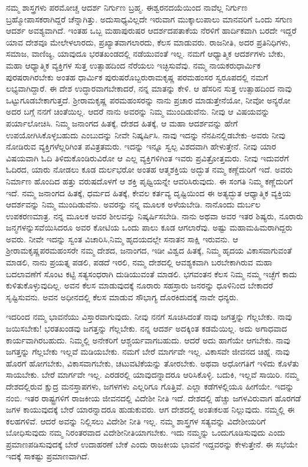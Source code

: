 ನಮ್ಮ ಶಾಸ್ತ್ರಗಳು ಪರಮೋಚ್ಚ ಆದರ್ಶ ನಿರ್ಗುಣ ಬ್ರಹ್ಮ. ಈಶ್ವರನ\break ದಯೆಯಿಂದ ನಾವೆಲ್ಲ ನಿರ್ಗುಣ ಬ್ರಹ್ಮೋಪಾಸಕರಾಗಿದ್ದರೆ ಚೆನ್ನಾಗಿತ್ತು. ಅದು\break ಸಾಧ್ಯವಿಲ್ಲದೇ ಇರುವಾಗ ಮುಕ್ಕಾಲುಪಾಲು ಮಾನವರಿಗೆ ಒಂದು ಸಗುಣ ಆದರ್ಶ ಅವಶ್ಯವಾಗಿದೆ. ಇಂತಹ ಒಬ್ಬ ಮಹಾಪುರುಷರ ಆದರ್ಶದ\break ಪತಾಕೆಯ ನೆರಳಿಗೆ ಹಾರ್ದಿಕವಾಗಿ ಬರದೇ ಇದ್ದರೆ ಯಾವ ದೇಶವೂ ಮೇಲೇಳ\-ಲಾರದು, ಪ್ರಖ್ಯಾತವಾಗಲಾರದು, ಕೆಲಸ ಮಾಡುವರು. ರಾಜನೀತಿ, ಅದರ ಪ್ರತಿನಿಧಿಗಳು, ಸಮಾಜ, ವಾಣಿಜ್ಯ, ಯಾವುದೂ ಭರತಖಂಡದಲ್ಲಿ ನಡೆಯುವಂತೆ ಇಲ್ಲ. ನಮಗೆ ಆಧ್ಯಾತ್ಮಿಕ ಆದರ್ಶಗಳು ಬೇಕು, ಮಹಾ ಆಧ್ಯಾತ್ಮಿಕ ವ್ಯಕ್ತಿಗಳ ಸುತ್ತ ಉತ್ಸಾಹದಿಂದ ನೆರೆಯಲು ಇಚ್ಛಿಸುವೆವು. ನಮ್ಮ ನಾಯಕರು\break ಧಾರ್ಮಿಕ ಪುರಷರಾಗಿರಬೇಕು ಅಂತಹ ಧಾರ್ಮಿಕ ಪುರುಷರೊಬ್ಬರು\break ರಾಮಕೃಷ್ಣ ಪರಮಹಂಸರ ಸ್ವರೂಪದಲ್ಲಿ ನಮಗೆ ಲಭ್ಯವಾಗಿದ್ದಾರೆ. ಈ ದೇಶ ಉದ್ಧಾರವಾಗಬೇಕಾದರೆ, ನನ್ನ ಮಾತನ್ನು ಕೇಳಿ. ಆ ಹೆಸರಿನ ಸುತ್ತ ಉತ್ಸಾಹದಿಂದ ನಾವು ಒಟ್ಟುಗೂಡಬೇಕಾಗುತ್ತದೆ. ಶ‍್ರೀರಾಮಕೃಷ್ಣ ಪರಮಹಂಸರನ್ನು ನಾನು ಪ್ರಚಾರ ಮಾಡುತ್ತೇನೆಯೋ, ನೀವೋ ಅನ್ಯರೋ ಅದರ ಬಗ್ಗೆ ನನಗೆ ಚಿಂತೆಯಿಲ್ಲ. ಆದರೆ ನಾನು ಅವರನ್ನು ನಿಮ್ಮ ಮುಂದಿಡುವೆನು. ನೀವು ಆ ವಿಷಯವನ್ನು ಪರ್ಯಾಲೋಚಿಸಿ. ನಿಮ್ಮ ಜನಾಂಗದ ಹಿತಕ್ಕೆ, ದೇಶದ ಹಿತಕ್ಕೆ, ಆ ಮಹಾ ಆದರ್ಶವನ್ನು ಹೇಗೆ ಉಪಯೋಗಿಸಿಕೊಳ್ಳಬಹುದು ಎಂಬುದನ್ನು ನೀವೇ ನಿಷ್ಕರ್ಷಿಸಿ. ನಾವು ಇದನ್ನು ನೆನಪಿನಲ್ಲಿಡಬೇಕು–ಅವರು ನೀವು ನೋಡಿರುವ ವ್ಯಕ್ತಿಗಳೆಲ್ಲರಿಗಿಂತ ಪವಿತ್ರತಮರು. ಇದನ್ನು ಇನ್ನೂ ಸ್ವಲ್ಪ ವಿಶದವಾಗಿ ಹೇಳುತ್ತೇನೆ. ನೀವು ಯಾರ ವಿಷಯವಾಗಿ ಓದಿ ತಿಳಿದುಕೊಂಡಿರುವಿರೋ ಆ ಎಲ್ಲ ವ್ಯಕ್ತಿಗಳಿಗಿಂತ ಇವರು ಪ್ರವಿತ್ರೋತ್ತಮರು. ನೀವು ಇದುವರೆಗೆ ಓದಿರದ, ಯಾರು ನೋಡಲು ಕೂಡ ದುರ್ಲಭರೋ ಅಂತಹ ಆತ್ಮ\break ಶಕ್ತಿಯ ಅದ್ಭುತ ನಮ್ಮ ಕಣ್ಣೆದುರಿಗೆ ಇದೆ. ಅವರು ನಿರ್ಮಾಣ ಹೊಂದಿದ ಹತ್ತು ವರುಷದೊಳಗೆ ಆ ಶಕ್ತಿ ಪೃಥ್ವಿಯನ್ನೇ ಆವರಿಸಿರುವುದು. ಈ ಸಂಗತಿ ನಿಮ್ಮ ಕಣ್ಣೆದುರಿಗೆ ಇದೆ. ನಮ್ಮ ಜನಾಂಗದ ಹಿತಕ್ಕೆ, ಧರ್ಮದ ಹಿತಕ್ಕೆ, ಕೇವಲ ಕರ್ತವ್ಯ ದೃಷ್ಟಿಯಿಂದ ಈ ಅತ್ಯದ್ಭುತ ಆಧ್ಯಾತ್ಮಿಕ ವ್ಯಕ್ತಿಯ ಆದರ್ಶವನ್ನು ನಿಮ್ಮ ಮುಂದಿಡುವೆನು. ಅವರನ್ನು ನನ್ನ ಮೂಲಕ ಅಳೆಯಬೇಡಿ. ನಾನೊಂದು ದುರ್ಬಲ ಉಪಕರಣಮಾತ್ರ. ನನ್ನ ಮೂಲಕ ಅವರ ಶೀಲವನ್ನು ನಿಷ್ಕರ್ಷಿಸಬೇಡಿ. ನಾನು ಅಥವಾ ಅವರ ಇತರ ಶಿಷ್ಯರು, ನೂರಾರು ಜನ್ಮಗಳನ್ನು\break ಸವೆಯಿಸಿದರೂ ಅವರ ಕೋಟಿಯ ಒಂದು ಪಾಲು ಕೂಡ ಆಗಲಾರೆವು. ಅಷ್ಟು ಮಹಾಮಹಿಮರಾಗಿದ್ದರು ಅವರು. ನೀವೇ ಇದನ್ನು ಸ್ವಂತ ವಿಚಾರಿಸಿ,\break ನಿಮ್ಮ ಹೃದಯದಲ್ಲೇ ಸನಾತನ ಸಾಕ್ಷಿ ಇರುವನು. ಆ ಶ‍್ರೀರಾಮಕೃಷ್ಣ\break ಪರಮಹಂಸರೇ ನಮ್ಮ ದೇಶದ, ಜನಾಂಗದ, ಇಡೀ ವಿಶ್ವದ ಹಿತಕ್ಕೆ, ನಿಮ್ಮ ಹೃದಯ ವಿಕಾಸವಾಗುವಂತೆ ಮಾಡಲಿ, ನಾನು ಪ್ರಯತ್ನ ಪಡಲಿ, ಪಡದೆ ಇರಲಿ, ನಮ್ಮ ದೇಶದಲ್ಲಿ ಆವಶ್ಯಕವಾಗಿ ಬರಬೇಕಾಗಿರುವ ಮಹಾ ಬದಲಾ\-ವಣೆಗೆ ಸೊಂಟ ಕಟ್ಟಿ ಸತ್ಯಸಂಧರಾಗಿ ದುಡಿಯುವಂತೆ ಮಾಡಲಿ. ಭಗವಂತನ ಕೆಲಸ ನಿಮ್ಮ ನಮ್ಮ ಇಚ್ಛೆಗೆ ಕಾದು ಕುಳಿತುಕೊಳ್ಳುವುದಿಲ್ಲ. ಅವನ ಕೆಲಸ ಮಾಡುವುದಕ್ಕೆ ನೂರಾರು ಸಹಸ್ರಾರು ಜನರನ್ನು ಧೂಳಿನಿಂದ ಬೇಕಾದರೆ ಸೃಷ್ಟಿಸುವನು. ಅವನ ಅಧೀನದಲ್ಲಿ ಕೆಲಸ ಮಾಡುವ ಸೌಭಾಗ್ಯ ದೊರಕಿದುದಕ್ಕೆ ನಾವೇ ಧನ್ಯರು.

ಇದರಿಂದ ನಮ್ಮ ಭಾವನೆಯು ವಿಸ್ತಾರವಾಗುವುದು. ನೀವು ನನಗೆ ಸೂಚಿಸಿದಂತೆ ನಾವು ಜಗತ್ತನ್ನು ಗೆಲ್ಲಬೇಕು. ನಾವು ಜಯಿಸಬೇಕು! ಭರತಖಂಡವು ಜಗತ್ತನ್ನು ಗೆಲ್ಲಬೇಕು. ನನ್ನ ಆದರ್ಶ ಅದಕ್ಕಿಂತ ಕಡಮೆಯಿಲ್ಲ. ಅದು ಅಗಾಧವಾದ ಕಾರ್ಯವಾಗಿರಬಹುದು. ನಿಮ್ಮಲ್ಲಿ ಅನೇಕರಿಗೆ ಆಶ್ಚರ್ಯವಾಗಬಹುದು. ಆದರೆ ಅದು ಹಾಗೆಯೇ ಆಗಬೇಕು. ನಾವು ಜಗತ್ತನ್ನು ಗೆಲ್ಲಬೇಕು ಇಲ್ಲವೆ ಮಡಿಯಬೇಕು. ನಮಗೆ ಬೇರೆ ಮಾರ್ಗವೇ ಇಲ್ಲ. ವಿಕಾಸವೇ ಜೀವನದ ಚಿಹ್ನೆ. ನಾವು ಹೊರಗೆ ಹೋಗಬೇಕು, ವಿಕಾಸವಾಗಬೇಕು, ಚಟುವಟಿಕೆಯನ್ನು ತೋರಬೇಕು. ಅಥವಾ ಅಧೋಗತಿಗೆ ಇಳಿದು ಕೊಳೆತು ಸಾಯಬೇಕು. ಬೇರೆ ಮಾರ್ಗವೇ ಇಲ್ಲ. ಎರಡರಲ್ಲಿ ಯಾವುದನ್ನಾದರೂ ಆರಿಸಿಕೊಳ್ಳಿ. ಬದುಕಿ, ಇಲ್ಲವೆ ಸಾಯಿರಿ. ನಮ್ಮ ದೇಶದಲ್ಲಿರುವ ಕ್ಷುದ್ರ ಮನಸ್ತಾಪಗಳು, ಜಗಳಗಳು ಎಲ್ಲರಿಗೂ ಗೊತ್ತಿವೆ. ಎಲ್ಲಾ ಕಡೆಗಳಲ್ಲಿಯೂ ಹೀಗೆಯೇ. ಇದನ್ನು ನಂಬಿ. ಇತರ ರಾಷ್ಟ್ರಗಳಿಗೆ ರಾಜಕೀಯ ಜೀವನದಲ್ಲಿ ವಿದೇಶೀ ನೀತಿ ಇದೆ. ದೇಶದಲ್ಲಿ ಹೆಚ್ಚು ಜಗಳವಿರುವಾಗ ಹೊರಗಡೆ ಜಗಳ ಕಾಯುವುದಕ್ಕೆ ಬೇರೆ ಯಾರನ್ನಾದರೂ ಹುಡುಕುವರು. ಆಗ ದೇಶದಲ್ಲಿ ಅಂತಃಕಲಹ ನಿಲ್ಲುವುದು. ನಮ್ಮಲ್ಲಿ ಈ ಕಲಹಗಳಿವೆ. ಆದರೆ ಅವನ್ನು ನಿಲ್ಲಿಸಲು ವಿದೇಶೀ ನೀತಿ ಇಲ್ಲ. ನಮ್ಮ ಶಾಸ್ತ್ರಗಳ ಸತ್ಯವನ್ನು ವಿದೇಶೀಯರಿಗೆ ಬೋಧಿಸುವುದು ನಮ್ಮ ನಿರಂತರವಾದ ವಿದೇಶೀನೀತಿಯಾಗಬೇಕು. ಇದು ನಮ್ಮನ್ನು ಒಂದುಗೂಡಿಸುವುದು ಎಂದು ಪ್ರಮಾಣ\-ಪಡಿಸುವುದಕ್ಕೆ ಬೇರೆ ಉದಾಹರಣೆ ಬೇಕೆ ಎಂದು ರಾಜಕೀಯ ಭಾವನೆ ಇದ್ದವರನ್ನು ಕೇಳುತ್ತೇನೆ. ಈ ಸಭೆಯೇ ಇದಕ್ಕೆ ಸಾಕಷ್ಟು ಪ್ರಮಾಣವಾಗಿದೆ.

